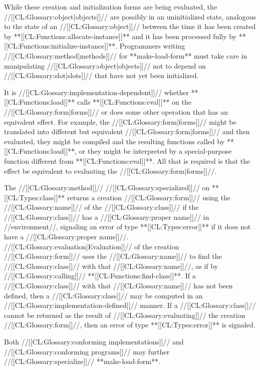 While these creation and initialization forms are being evaluated, the //[[CL:Glossary:object|objects]]// are possibly in an uninitialized state, analogous to the state of an //[[CL:Glossary:object]]// between the time it has been created by **[[CL:Functions:allocate-instance]]** and it has been processed fully by **[[CL:Functions:initialize-instance]]**. Programmers writing //[[CL:Glossary:method|methods]]// for **make-load-form** must take care in manipulating //[[CL:Glossary:object|objects]]// not to depend on //[[CL:Glossary:slot|slots]]// that have not yet been initialized.

It is //[[CL:Glossary:implementation-dependent]]// whether **[[CL:Functions:load]]** calls **[[CL:Functions:eval]]** on the //[[CL:Glossary:form|forms]]// or does some other operation that has an equivalent effect. For example, the //[[CL:Glossary:form|forms]]// might be translated into different but equivalent //[[CL:Glossary:form|forms]]// and then evaluated, they might be compiled and the resulting functions called by **[[CL:Functions:load]]**, or they might be interpreted by a special-purpose function different from **[[CL:Functions:eval]]**. All that is required is that the effect be equivalent to evaluating the //[[CL:Glossary:form|forms]]//.

The //[[CL:Glossary:method]]// //[[CL:Glossary:specialized]]// on **[[CL:Types:class]]** returns a creation //[[CL:Glossary:form]]// using the //[[CL:Glossary:name]]// of the //[[CL:Glossary:class]]// if the //[[CL:Glossary:class]]// has a //[[CL:Glossary:proper name]]// in //environment//, signaling an error of type **[[CL:Types:error]]** if it does not have a //[[CL:Glossary:proper name]]//. //[[CL:Glossary:evaluation|Evaluation]]// of the creation //[[CL:Glossary:form]]// uses the //[[CL:Glossary:name]]// to find the //[[CL:Glossary:class]]// with that //[[CL:Glossary:name]]//, as if by //[[CL:Glossary:calling]]// **[[CL:Functions:find-class]]**. If a //[[CL:Glossary:class]]// with that //[[CL:Glossary:name]]// has not been defined, then a //[[CL:Glossary:class]]// may be computed in an //[[CL:Glossary:implementation-defined]]// manner. If a //[[CL:Glossary:class]]// cannot be returned as the result of //[[CL:Glossary:evaluating]]// the creation //[[CL:Glossary:form]]//, then an error of type **[[CL:Types:error]]** is signaled.

Both //[[CL:Glossary:conforming implementations]]// and //[[CL:Glossary:conforming programs]]// may further //[[CL:Glossary:specialize]]// **make-load-form**.

